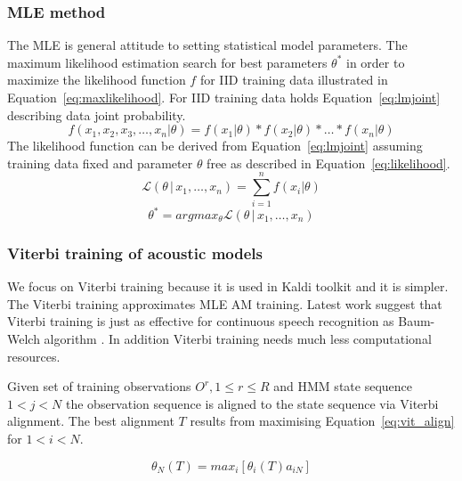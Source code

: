 {\subsubsection*{\acl{MLE} method}
\label{sub:mle_method}
The \ac{MLE} is general attitude to setting statistical model parameters.
The maximum likelihood estimation search for best parameters $\theta^*$ 
in order to maximize the likelihood function $f$ for \ac{IID} training data illustrated in Equation~\ref{eq:maxlikelihood}.
For \ac{IID} training data holds Equation~\ref{eq:lmjoint} describing data joint probability. 
\begin{equation}\label{eq:lmjoint}
    f(x_1, x_2, x_3, \ldots, x_n | \theta) = f(x_1 | \theta) * f(x_2 | \theta) * \ldots * f(x_n | \theta)
\end{equation}
The likelihood function can be derived from Equation~\ref{eq:lmjoint} assuming training data fixed
and parameter $\theta$ free as described in Equation~\ref{eq:likelihood}.
\begin{equation}\label{eq:likelihood}
    \mathcal{L}(\theta\,|\,x_1,\ldots,x_n) = \sum_{i=1}^n f(x_i|\theta)
\end{equation}
\begin{equation}\label{eq:maxlikelihood}
    \theta^* = argmax_{\theta} \mathcal{L}(\theta\,|\,x_1,\ldots,x_n)
\end{equation}



\subsubsection*{Viterbi training of acoustic models}
We focus on Viterbi training because it is used in Kaldi toolkit and it is simpler.
The Viterbi training approximates \ac{MLE} \ac{AM} training.
Latest work suggest that Viterbi training is just as effective for continuous
speech recognition as Baum-Welch algorithm \cite{rodriguez2003comparative}.
In addition Viterbi training needs much less computational resources. 

Given set of training observations $O^r, 1 \le r \le R$ and \ac{HMM} state sequence $ 1 < j < N$ the observation sequence is aligned to the state sequence via Viterbi alignment.\cite{buthpitiya2012parallel}
The best alignment $T$ results from maximising Equation~\ref{eq:vit_align} for $ 1 < i < N$.


\begin{equation}\label{eq:vit_align}
    \theta_N(T)= max_i[\theta_i(T)a_{iN}] 
\end{equation}

}
